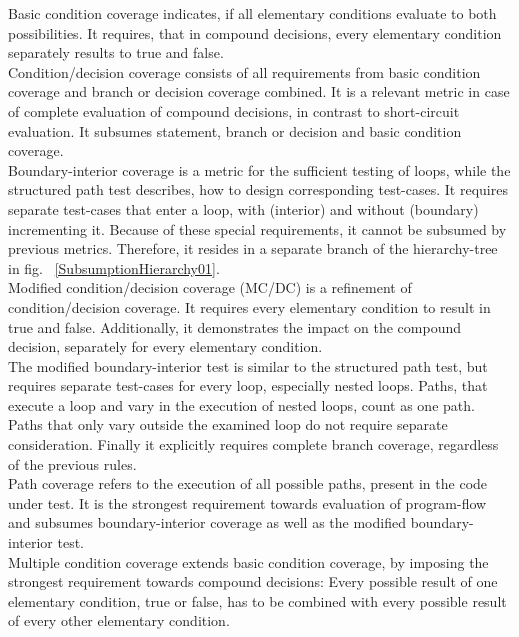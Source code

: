 	Basic condition coverage indicates, if all elementary conditions evaluate to both possibilities. It requires, that in compound decisions, every elementary condition separately results to true and false.  \\

	Condition/decision coverage consists of all requirements from basic condition coverage and branch or decision coverage combined. It is a relevant metric in case of complete evaluation of compound decisions, in contrast to short-circuit evaluation. It subsumes statement, branch or decision and basic condition coverage. \\
	
	Boundary-interior coverage is a metric for the sufficient testing of loops, while the structured path test describes, how to design corresponding test-cases. It requires separate test-cases that enter a loop, with (interior) and without (boundary) incrementing it.	Because of these special requirements, it cannot be subsumed by previous metrics. Therefore, it resides in a separate branch of the hierarchy-tree in fig. ~\ref{SubsumptionHierarchy01}. \\

	Modified condition/decision coverage (MC/DC) is a refinement of condition/decision coverage. It requires every elementary condition to result in true and false. Additionally, it  demonstrates the impact on the compound decision, separately for every elementary condition. 	\\

	The modified boundary-interior test is similar to the structured path test, but requires separate test-cases for every loop, especially nested loops. Paths, that execute a loop and vary in the execution of nested loops, count as one path. Paths that only vary outside the examined loop do not require separate consideration. Finally it explicitly requires complete branch coverage, regardless of the previous rules. \\

	Path coverage refers to the execution of all possible paths, present in the code under test. It is the strongest requirement towards evaluation of program-flow and subsumes boundary-interior coverage as well as the modified boundary-interior test.  \\


	Multiple condition coverage extends basic condition coverage, by imposing the strongest requirement towards compound decisions: Every possible result of one elementary condition, true or false, has to be combined with every possible result of every other elementary condition. \\

